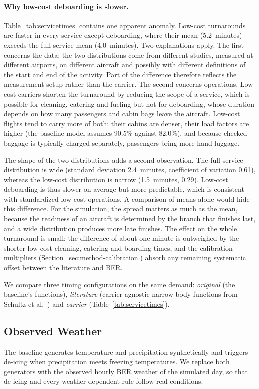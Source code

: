 \paragraph{Why low-cost deboarding is slower.}
Table~\ref{tab:servicetimes} contains one apparent anomaly. Low-cost turnarounds are faster in every service except deboarding, where their mean (5.2~minutes) exceeds the full-service mean (4.0~minutes). Two explanations apply. The first concerns the data: the two distributions come from different studies, measured at different airports, on different aircraft and possibly with different definitions of the start and end of the activity. Part of the difference therefore reflects the measurement setup rather than the carrier. The second concerns operations. Low-cost carriers shorten the turnaround by reducing the scope of a service, which is possible for cleaning, catering and fueling but not for deboarding, whose duration depends on how many passengers and cabin bags leave the aircraft. Low-cost flights tend to carry more of both: their cabins are denser, their load factors are higher (the baseline model assumes 90.5\% against 82.0\%), and because checked baggage is typically charged separately, passengers bring more hand luggage.

The shape of the two distributions adds a second observation. The full-service distribution is wide (standard deviation 2.4~minutes, coefficient of variation 0.61), whereas the low-cost distribution is narrow (1.5~minutes, 0.29). Low-cost deboarding is thus slower on average but more predictable, which is consistent with standardized low-cost operations. A comparison of means alone would hide this difference. For the simulation, the spread matters as much as the mean, because the readiness of an aircraft is determined by the branch that finishes last, and a wide distribution produces more late finishes. The effect on the whole turnaround is small: the difference of about one minute is outweighed by the shorter low-cost cleaning, catering and boarding times, and the calibration multipliers (Section~\ref{sec:method-calibration}) absorb any remaining systematic offset between the literature and BER.

We compare three timing configurations on the same demand: \emph{original} (the baseline's functions), \emph{literature} (carrier-agnostic narrow-body functions from Schultz et al.~\cite{schultz2012dynamic,schultz2018boarding}) and \emph{carrier} (Table~\ref{tab:servicetimes}).

\subsection{Observed Weather}
The baseline generates temperature and precipitation synthetically and triggers de-icing when precipitation meets freezing temperatures. We replace both generators with the observed hourly BER weather of the simulated day, so that de-icing and every weather-dependent rule follow real conditions.

